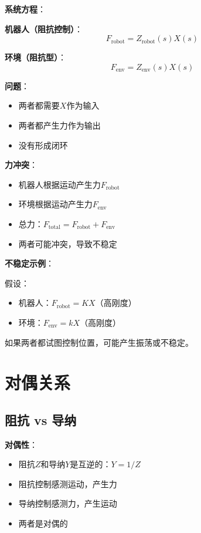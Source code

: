 \documentclass[12pt,a4paper]{article}
\begin{document}
\textbf{系统方程}：

\textbf{机器人（阻抗控制）}：
\begin{equation}
F_{\text{robot}} = Z_{\text{robot}}(s) X(s)
\end{equation}

\textbf{环境（阻抗型）}：
\begin{equation}
F_{\text{env}} = Z_{\text{env}}(s) X(s)
\end{equation}

\textbf{问题}：
\begin{itemize}
\item 两者都需要$X$作为输入
\item 两者都产生力作为输出
\item 没有形成闭环
\end{itemize}

\textbf{力冲突}：
\begin{itemize}
\item 机器人根据运动产生力$F_{\text{robot}}$
\item 环境根据运动产生力$F_{\text{env}}$
\item 总力：$F_{\text{total}} = F_{\text{robot}} + F_{\text{env}}$
\item 两者可能冲突，导致不稳定
\end{itemize}

\textbf{不稳定示例}：

假设：
\begin{itemize}
\item 机器人：$F_{\text{robot}} = K X$（高刚度）
\item 环境：$F_{\text{env}} = k X$（高刚度）
\end{itemize}

如果两者都试图控制位置，可能产生振荡或不稳定。

\section{对偶关系}

\subsection{阻抗 vs 导纳}

\textbf{对偶性}：
\begin{itemize}
\item 阻抗$Z$和导纳$Y$是互逆的：$Y = 1/Z$
\item 阻抗控制感测运动，产生力
\item 导纳控制感测力，产生运动
\item 两者是对偶的
\end{itemize}
\end{document}
